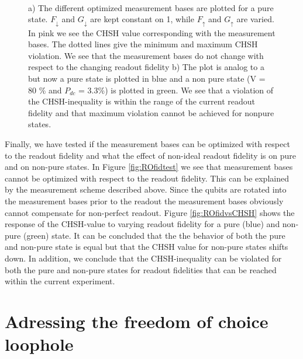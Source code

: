 \begin{figure*}[!htb]\centering
         ~ %
         ~ %
          \caption{a) The different optimized measurement bases are plotted for a pure state. $F_\downarrow$ and $G_\downarrow$ are kept constant on 1, while $F_\uparrow$ and $G_\uparrow$ are varied. In pink we see the CHSH value corresponding with the measurement bases. The dotted lines give the minimum and maximum CHSH violation. We see that the measurement bases do not change with respect to the changing readout fidelity b) The plot is analog to a but now a pure state is plotted in blue and a non pure state (V = 80 \% and $P_{dc}$ = 3.3\%) is plotted in green. We see that a violation of the CHSH-inequality is within the range of the current readout fidelity and that maximum violation cannot be achieved for nonpure states.} \label{fig:animals}

\end{figure*}

Finally, we have tested if the measurement bases can be optimized with respect to the readout fidelity and what the effect of non-ideal readout fidelity is on pure and on non-pure states. In Figure \ref{fig:ROfidtest} we see that measurement bases cannot be optimized with respect to the readout fidelity. This can be explained by the measurement scheme described above. Since the qubits are rotated into the measurement bases prior to the readout the measurement bases obviously cannot compensate for non-perfect readout. Figure \ref{fig:ROfidvsCHSH} shows the response of the CHSH-value to varying readout fidelity for a pure (blue) and non-pure (green) state. It can be concluded that the the behavior of both the pure and non-pure state is equal but that the CHSH value for non-pure states shifts down. In addition, we conclude that the CHSH-inequality can be violated for both the pure and non-pure states for readout fidelities that can be reached within the current experiment.


\color{tudelft-cyan}
\section{Adressing the freedom of choice loophole}
\color{black}
